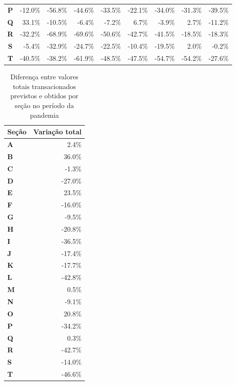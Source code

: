 \begin{table}[htb]
\begin{tabular}{c|r|r|r|r|r|r|r|r}
        \textbf{P} & -12.0\% & -56.8\% & -44.6\% & -33.5\% & -22.1\% & -34.0\% & -31.3\% & -39.5\% \\
        \textbf{Q} &  33.1\% & -10.5\% &  -6.4\% &  -7.2\% &   6.7\% &  -3.9\% &   2.7\% & -11.2\% \\
        \textbf{R} & -32.2\% & -68.9\% & -69.6\% & -50.6\% & -42.7\% & -41.5\% & -18.5\% & -18.3\% \\
        \textbf{S} &  -5.4\% & -32.9\% & -24.7\% & -22.5\% & -10.4\% & -19.5\% &   2.0\% &  -0.2\% \\
        \textbf{T} & -40.5\% & -38.2\% & -61.9\% & -48.5\% & -47.5\% & -54.7\% & -54.2\% & -27.6\% \\
        \bottomrule
    \end{tabular}
\fdadospesquisa
\end{table}

\begin{table}[htb]
\centering
\caption{Diferença entre valores totais transacionados previstos e obtidos por seção no período da pandemia}
\label{tab:pandemia:variacao-total-por-secao}
    \begin{tabular}{l|r}
        \toprule
        \textbf{Seção} & Variação total \\
        \midrule
        \textbf{A} &   2.4\% \\
        \textbf{B} &  36.0\% \\
        \textbf{C} &  -1.3\% \\
        \textbf{D} & -27.0\% \\
        \textbf{E} &  23.5\% \\
        \textbf{F} & -16.0\% \\
        \textbf{G} &  -9.5\% \\
        \textbf{H} & -20.8\% \\
        \textbf{I} & -36.5\% \\
        \textbf{J} & -17.4\% \\
        \textbf{K} & -17.7\% \\
        \textbf{L} & -42.8\% \\
        \textbf{M} &   0.5\% \\
        \textbf{N} &  -9.1\% \\
        \textbf{O} &  20.8\% \\
        \textbf{P} & -34.2\% \\
        \textbf{Q} &   0.3\% \\
        \textbf{R} & -42.7\% \\
        \textbf{S} & -14.0\% \\
        \textbf{T} & -46.6\% \\
        \bottomrule
    \end{tabular}
\fdadospesquisa
\end{table}

